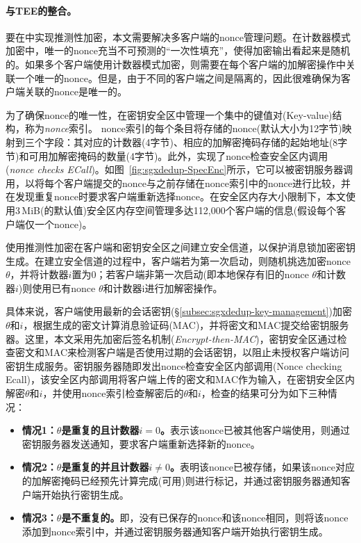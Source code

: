 \paragraph*{与TEE的整合。}要在\sysnameS 中实现推测性加密，本文需要解决多客户端的nonce管理问题。在计数器模式加密中，唯一的nonce充当不可预测的“一次性填充”，使得加密输出看起来是随机的\cite{counter}。如果多个客户端使用计数器模式加密，则需要在每个客户端的加解密操作中关联一个唯一的nonce。但是，由于不同的客户端之间是隔离的，因此很难确保为客户端关联的nonce是唯一的。

为了确保nonce的唯一性，\sysnameS 在密钥安全区中管理一个集中的键值对(Key-value)结构，称为\textit{nonce}索引。 nonce索引的每个条目将存储的nonce(默认大小为12字节)映射到三个字段：其对应的计数器(4字节)、相应的加解密掩码存储的起始地址(8字节)和可用加解密掩码的数量(4字节)。此外，\sysnameS 实现了nonce检查安全区内调用(\textit{nonce checks ECall})。如图~\ref{fig:sgxdedup-SpecEnc}所示，它可以被密钥服务器调用，以将每个客户端提交的nonce与之前存储在nonce索引中的nonce进行比较，并在发现重复nonce时要求客户端重新选择nonce。在安全区内存大小限制下，本文使用3\,MiB(\sysnameS 的默认值)安全区内存空间管理多达112,000个客户端的信息(假设每个客户端仅一个nonce)。

\sysnameS 使用推测性加密在客户端和密钥安全区之间建立安全信道，以保护消息锁加密密钥生成。在建立安全信道的过程中，客户端若为第一次启动，则随机挑选加密nonce $\theta$，并将计数器$i$置为0；若客户端非第一次启动(即本地保存有旧的nonce $\theta$和计数器$i$)则使用已有nonce $\theta$和计数器i进行加解密操作。

具体来说，客户端使用最新的会话密钥(\S\ref{subsec:sgxdedup-key-management})加密$\theta$和$i$，根据生成的密文计算消息验证码(MAC)，并将密文和MAC提交给密钥服务器。这里，本文采用先加密后签名机制(\textit{Encrypt-then-MAC})\cite{bellare2000Authenticated}，密钥安全区通过检查密文和MAC来检测客户端是否使用过期的会话密钥，以阻止未授权客户端访问密钥生成服务。密钥服务器随即发出nonce检查安全区内部调用(Nonce checking Ecall)，该安全区内部调用将客户端上传的密文和MAC作为输入，在密钥安全区内解密$\theta$和$i$，并使用nonce索引检查解密后的$\theta$和$i$，检查的结果可分为如下三种情况：

\begin{itemize}[leftmargin=0em]
    \item \textbf{情况1：$\theta$是重复的且计数器$i = 0$。}表示该nonce已被其他客户端使用，则通过密钥服务器发送通知，要求客户端重新选择新的nonce。
    \item \textbf{情况2：$\theta$是重复的并且计数器$i \neq 0$。}表明该nonce已被存储，如果该nonce对应的加解密掩码已经预先计算完成(可用)则进行标记，并通过密钥服务器通知客户端开始执行密钥生成。
    \item \textbf{情况3：$\theta$是不重复的。}即，没有已保存的nonce和该nonce相同，则将该nonce添加到nonce索引中，并通过密钥服务器通知客户端开始执行密钥生成。
\end{itemize}

